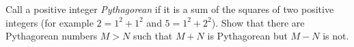 Call a positive integer \emph{Pythagorean} if it is a sum of the squares of two positive integers (for example $2=1^2+1^2$ and $5=1^2+2^2$). Show that there are Pythagorean numbers $M>N$ such that $M+N$ is Pythagorean but $M-N$ is not.
